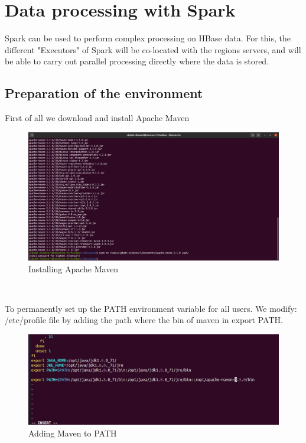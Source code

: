 \chapter{Data processing with Spark}
\par Spark can be used to perform complex processing on HBase data. For this, the different "Executors" of Spark will be co-located with the regions
servers, and will be able to carry out parallel processing directly where the data is stored.
\begin{spacing}{1.2}
\section{Preparation of the environment }
\par First of all we download and install Apache Maven
\\
\begin{figure}[!htb] 
\begin{center} 
\includegraphics[width=1\linewidth]{Pictures/HBase/Data processing with Spark/Preparation of the environment/Installing Apache Maven} 
\end{center} 
\caption{Installing Apache Maven} 
\end{figure}  \FloatBarrier
\\
\newpage
\par To permanently set up the PATH environment variable for all users. We modify: /etc/profile file by adding the path where the bin of maven in export PATH.
\\
\begin{figure}[!htb] 
\begin{center} 
\includegraphics[width=1\linewidth]{Pictures/HBase/Data processing with Spark/Preparation of the environment/Adding Maven to PATH} 
\end{center} 
\caption{Adding Maven to PATH} 
\end{figure}  \FloatBarrier
\\


\end{spacing}
